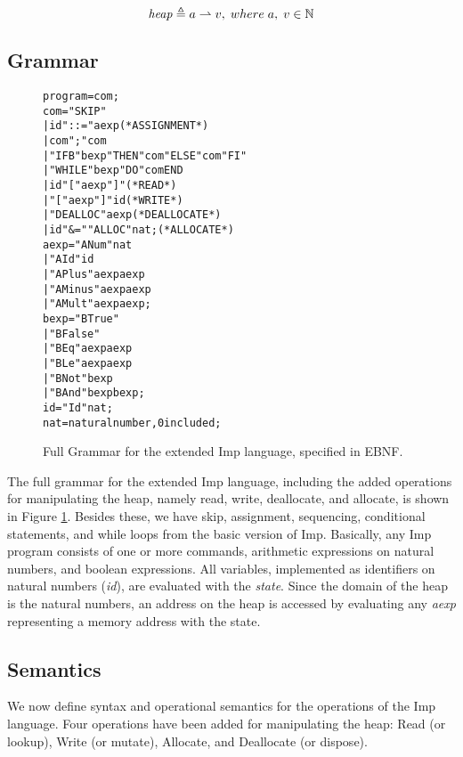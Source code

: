 \[
\mathit{heap} \mathrel{\triangleq} a\rightharpoonup v, \; where\; a, \;v \in \mathbb{N}
\] 

\subsection{Grammar}

\begin{figure}
\begin{alltt}
                  program = com ;
                  com =   "SKIP"
                        | id "::=" aexp            (* ASSIGNMENT *)
                        | com ";" com
                        | "IFB" bexp "THEN" com "ELSE" com "FI"
                        | "WHILE" bexp "DO" com END
                        | id \lsquigarr "[" aexp "]"       (* READ *)
                        | "[" aexp "]" \lsquigarr id       (* WRITE *)
                        | "DEALLOC" aexp           (* DEALLOCATE *)
                        | id "&=" "ALLOC" nat ;    (* ALLOCATE *)
                  aexp =  "ANum" nat
                        | "AId" id
                        | "APlus" aexp aexp
                        | "AMinus" aexp aexp
                        | "AMult" aexp aexp ;
                  bexp =  "BTrue"
                        | "BFalse"
                        | "BEq" aexp aexp
                        | "BLe" aexp aexp
                        | "BNot" bexp
                        | "BAnd" bexp bexp ;
                  id = "Id" nat ;
                  nat = natural number, 0 included ;
\end{alltt}
\caption{Full Grammar for the extended Imp language, specified in EBNF.}
\label{fig:imp_grammar}
\end{figure}

The full grammar for the extended Imp language, including the added operations for manipulating the heap, namely read, write, deallocate, and allocate, is shown in Figure \ref{fig:imp_grammar}. Besides these, we have skip, assignment, sequencing, conditional statements, and while loops from the basic version of Imp. Basically, any Imp program consists of one or more commands, arithmetic expressions on natural numbers, and boolean expressions. All variables, implemented as identifiers on natural numbers ({\it id}), are evaluated with the {\it state}. Since the domain of the heap is the natural numbers, an address on the heap is accessed by evaluating any {\it aexp} representing a memory address with the state.

\subsection{Semantics}
\label{sec:semantics}
We now define syntax and operational semantics for the operations of the Imp language. Four operations have been added for manipulating the heap: Read (or lookup), Write (or mutate), Allocate, and Deallocate (or dispose).

